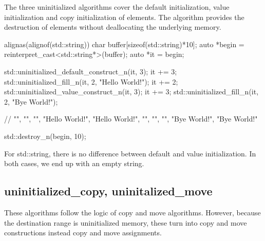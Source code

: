 The three uninitialized algorithms cover the default initialization, value initialization and copy initialization of elements. The  algorithm provides the destruction of elements without deallocating the underlying memory.



\begin{box-note}
\begin{cppcode}
alignas(alignof(std::string)) char buffer[sizeof(std::string)*10];
auto *begin = reinterpret_cast<std::string*>(buffer);
auto *it = begin;

std::uninitialized_default_construct_n(it, 3);
it += 3;
std::uninitialized_fill_n(it, 2, "Hello World!");
it += 2;
std::uninitialized_value_construct_n(it, 3);
it += 3;
std::uninitialized_fill_n(it, 2, "Bye World!");

// {"", "", "", "Hello World!", "Hello World!", "", "", "", "Bye World!", "Bye World!"}

std::destroy_n(begin, 10);
\end{cppcode}
\end{box-note}

For std::string, there is no difference between default and value initialization. In both cases, we end up with an empty string.

\subsection{uninitialized\_copy, uninitalized\_move}



These algorithms follow the logic of copy and move algorithms. However, because the destination range is uninitialized memory, these turn into copy and move constructions instead copy and move assignments.

